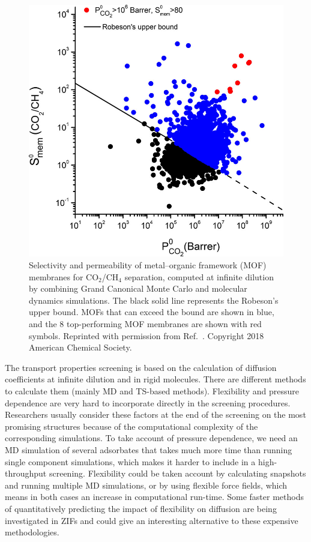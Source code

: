 \documentclass[main.tex]{subfiles}
\begin{document}
\begin{figure}[ht]
\centering
  \includegraphics[width=0.5\linewidth]{figures/1-screening/Altintas_2018.jpeg}
  \caption{Selectivity and permeability of metal--organic framework (MOF) membranes for CO$_2$/CH$_4$ separation, computed at infinite dilution by combining Grand Canonical Monte Carlo and molecular dynamics simulations.\cite{Altintas_2018} The black solid line represents the Robeson's upper bound.\cite{robeson1991correlation, Robeson_2008} MOFs that can exceed the bound are shown in blue, and the 8 top-performing MOF membranes are shown with red symbols. Reprinted with permission from Ref.~. Copyright 2018 American Chemical Society.}
  \label{fgr:Altintas_2018}
\end{figure}

The transport properties screening is based on the calculation of diffusion coefficients at infinite dilution and in rigid molecules. There are different methods to calculate them (mainly MD and TS-based methods). Flexibility and pressure dependence are very hard to incorporate directly in the screening procedures. Researchers usually consider these factors at the end of the screening on the most promising structures because of the computational complexity of the corresponding simulations. {To take account of} pressure dependence, {we need} an MD simulation of several adsorbates { that takes much more time than running single component simulations},\cite{Keskin_2007, Keskin_2009} which {makes it harder to include in a} high-throughput screening. Flexibility could be taken account by calculating snapshots and running multiple MD simulations, or by using flexible force fields, which means in both cases an increase in computational run-time. Some faster methods of quantitatively predicting the impact of flexibility on diffusion are being investigated in ZIFs and could give an interesting alternative to these expensive methodologies.\cite{Han_2020}
\end{document}
